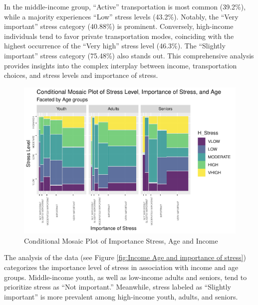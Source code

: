 \documentclass[
11pt, %
oneside, %
english, %
singlespacing, %
]{macthesis} %
\begin{document}
In the middle-income group, ``Active'' transportation is most common (39.2\%), while a majority experiences ``Low'' stress levels (43.2\%). Notably, the ``Very important'' stress category (40.88\%) is prominent. Conversely, high-income individuals tend to favor private transportation modes, coinciding with the highest occurrence of the ``Very high'' stress level (46.3\%). The ``Slightly important'' stress category (75.48\%) also stands out. This comprehensive analysis provides insights into the complex interplay between income, transportation choices, and stress levels and importance of stress.
\begin{figure}
\includegraphics[width=0.85\linewidth]{thesis_files/figure-latex/unnamed-chunk-29-1} \caption{\label{fig:Income Age and importance of stress}Conditional Mosaic Plot of Importance Stress, Age and Income}\label{fig:unnamed-chunk-29}
\end{figure}
The analysis of the data (see Figure \ref{fig:Income Age and importance of stress}) categorizes the importance level of stress in association with income and age groups. Middle-income youth, as well as low-income adults and seniors, tend to prioritize stress as ``Not important.'' Meanwhile, stress labeled as ``Slightly important'' is more prevalent among high-income youth, adults, and seniors.
\end{document}
